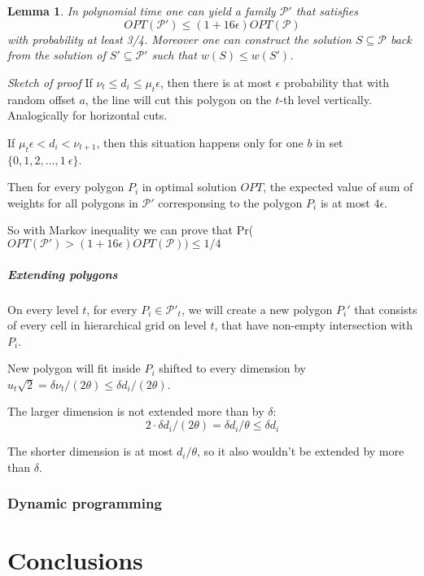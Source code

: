 \documentclass[en]{pracamgr}
\newtheorem{lemma}{Lemma}[section]
\begin{document}
\begin{lemma}
In polynomial time one can yield a family $\mathcal{P'}$
that satisfies $$OPT(\mathcal{P'}) \le (1+16\epsilon)OPT(\mathcal{P})$$
with probability at least 3/4.
Moreover one can construct the solution $S \subseteq \mathcal{P}$
back from the solution of $S' \subseteq \mathcal{P'}$
such that $w(S) \le w(S')$.
\end{lemma}

\textit{Sketch of proof}
If $\nu_t \le d_i \le \mu_t\epsilon$, then there is at most
$\epsilon$ probability that with random offset $a$,
the line will cut this polygon on the $t$-th level vertically.
Analogically for horizontal cuts.

If $\mu_t\epsilon < d_i < \nu_{t+1}$, then this situation happens
only for one $b$ in set $\{0, 1, 2, \ldots, 1\ \epsilon\}$.

Then for every polygon $P_i$ in optimal solution $OPT$, the expected value
of sum of weights for all polygons in $\mathcal{P'}$
corresponsing to the polygon $P_i$ is at most $4\epsilon$.

So with Markov inequality we can prove that
Pr($OPT(\mathcal{P'}) > (1+16\epsilon)OPT(\mathcal{P})) \le 1/4$

\paragraph{Extending polygons}
On every level $t$, for every $P_i \in \mathcal{P'}_t$,
we will create a new polygon $P_i'$ that
consists of every cell in hierarchical grid on level $t$,
that have non-empty intersection with $P_i$.

New polygon will fit inside $P_i$ shifted to every dimension by
$u_t\sqrt{2} = \delta \nu_t/(2\theta) \le \delta d_i/(2\theta)$.

The larger dimension is not extended more than by $\delta$:
$$2 \cdot \delta d_i/(2\theta) = \delta d_i/\theta \le \delta d_i$$

The shorter dimension is at most $d_i/\theta$,
so it also wouldn't be extended by more than $\delta$.



\subsection{Dynamic programming}






\chapter{Conclusions}
\end{document}
